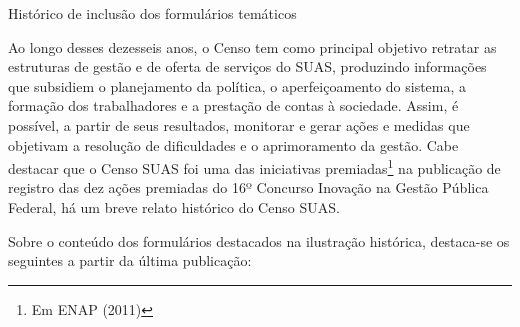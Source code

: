 \documentclass[
  letterpaper,
  DIV=11,
  numbers=noendperiod]{scrreprt}
\begin{document}
\begin{table}

\caption{\label{tbl-formularios}Histórico de inclusão dos formulários
temáticos}


\end{table}%

Ao longo desses dezesseis anos, o Censo tem como principal objetivo
retratar as estruturas de gestão e de oferta de serviços do SUAS,
produzindo informações que subsidiem o planejamento da política, o
aperfeiçoamento do sistema, a formação dos trabalhadores e a prestação
de contas à sociedade. Assim, é possível, a partir de seus resultados,
monitorar e gerar ações e medidas que objetivam a resolução de
dificuldades e o aprimoramento da gestão. Cabe destacar que o Censo SUAS
foi uma das iniciativas premiadas\footnote{Em ENAP (2011)} na publicação
de registro das dez ações premiadas do 16º Concurso Inovação na Gestão
Pública Federal, há um breve relato histórico do Censo SUAS.

Sobre o conteúdo dos formulários destacados na ilustração histórica,
destaca-se os seguintes a partir da última publicação:
\end{document}
